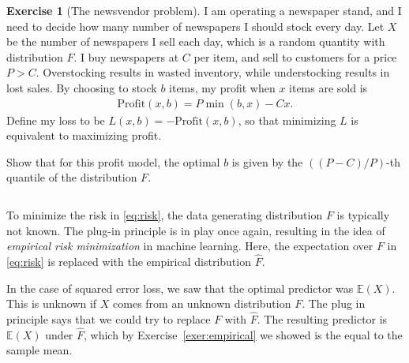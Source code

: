 \documentclass[11pt]{article}
\theoremstyle{definition}
\newtheorem{exercise}[]{Exercise}
\newcommand{\E}{\mathbb{E}}
\begin{document}
\begin{exercise}[The newsvendor problem]
  I am operating a newspaper stand, and I need to decide how many number of newspapers
  I should stock every day.
  Let $X$ be the number of newspapers I sell each day, which is a random quantity with
  distribution $F$.
  I buy newspapers at $C$  per item, and sell to customers for a price $P > C$.
  Overstocking results in wasted inventory, while understocking results in lost sales.
  By choosing to stock $b$ items, my profit when $x$ items
  are sold is
  \begin{align}
    \textrm{Profit}(x, b) = P\min(b, x) - Cx.
  \end{align}
  Define my loss to be $L(x, b) = - \textrm{Profit}(x, b)$, so that
  minimizing $L$ is equivalent to maximizing profit.

  Show that for this profit model, the optimal $b$ is given by the $((P - C)/P)$-th
  quantile of the distribution $F$.

\end{exercise}

$\quad$

To minimize the risk in \eqref{eq:risk}, the data generating distribution
$F$ is typically not known.
The plug-in principle is in play once again, resulting in the idea of
\textit{empirical risk minimization} in machine learning.
Here, the expectation over $F$ in \eqref{eq:risk} is replaced with the empirical
distribution $\hat F$.

In the case of squared error loss, we saw that the optimal predictor was
$\E(X)$. This is unknown if $X$ comes from an unknown distribution $F$.
The plug in principle says that we could try to replace $F$ with $\hat F$.
The resulting predictor is $\E(X)$ under $\hat F$, which by
Exercise~\ref{exer:empirical} we showed is the equal to the sample mean.
\end{document}
